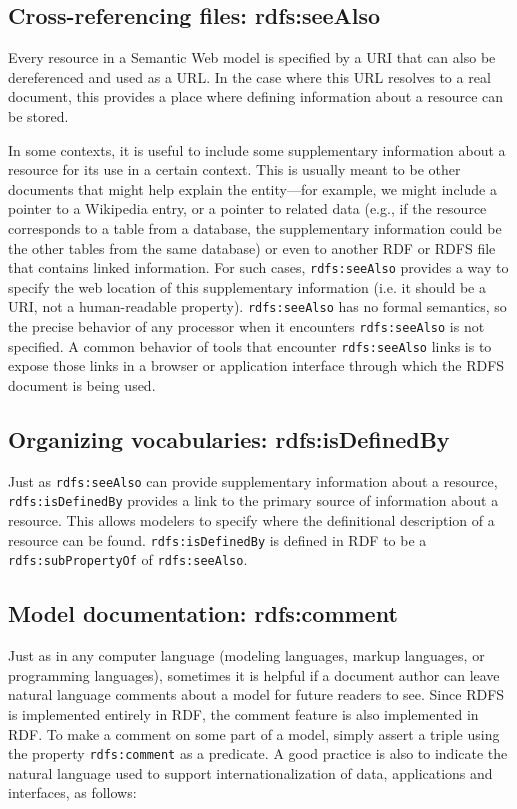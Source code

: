 \subsection{Cross-referencing files: rdfs:seeAlso}

Every resource in a Semantic Web model is specified by a URI that can
also be dereferenced and used as a URL. In the case where this URL
resolves to a real document, this provides a place where defining
information about a resource can be stored.

In some contexts, it is useful to include some supplementary information
about a resource for its use in a certain context. This is usually meant
to be other documents that might help explain the entity---for example,
we might include a pointer to a Wikipedia entry, or a pointer to related
data (e.g., if the resource corresponds to a table from a database, the
supplementary information could be the other tables from the same
database) or even to another RDF or RDFS file that contains linked
information. For such cases, \texttt{rdfs:seeAlso} provides a way to specify the
web location of this supplementary information (i.e. it should be a URI,
not a human-readable property). \texttt{rdfs:seeAlso} has no formal semantics, so
the precise behavior of any processor when it encounters \texttt{rdfs:seeAlso} is
not specified. A common behavior of tools that encounter \texttt{rdfs:seeAlso}
links is to expose those links in a browser or application interface
through which the RDFS document is being used.

\subsection{Organizing vocabularies: rdfs:isDefinedBy}

Just as \texttt{rdfs:seeAlso} can provide supplementary information about a
resource, \texttt{rdfs:isDefinedBy} provides a link to the primary source of
information about a resource. This allows modelers to specify where the
definitional description of a resource can be found. \texttt{rdfs:isDefinedBy} is
defined in RDF to be a \texttt{rdfs:subPropertyOf} of \texttt{rdfs:seeAlso}.

\subsection{Model documentation: rdfs:comment}

Just as in any computer language (modeling languages, markup languages,
or programming languages), sometimes it is helpful if a document author
can leave natural language comments about a model for future readers to
see. Since RDFS is implemented entirely in RDF, the comment feature is
also implemented in RDF. To make a comment on some part of a model,
simply assert a triple using the property \texttt{rdfs:comment} as a predicate.
A good practice is also to indicate the natural language used to support internationalization of data, applications and interfaces, as follows:

